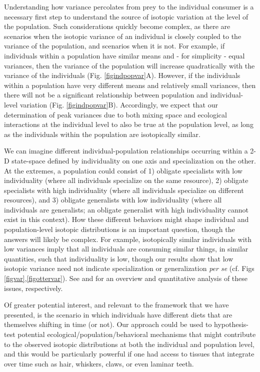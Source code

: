 \documentclass{frontiersSCNS}
\begin{document}
Understanding how variance percolates from prey to the individual consumer is a necessary first step to understand the source of isotopic variation at the level of the population.
Such considerations quickly become complex, as there are scenarios when the isotopic variance of an individual is closely coupled to the variance of the population, and scenarios when it is not.
For example, if individuals within a population have similar means and - for simplicity - equal variances, then the variance of the population will increase quadratically with the variance of the individuals (Fig. \ref{figindpopvar}A).
However, if the individuals within a population have very different means and relatively small variances, then there will not be a significant relationship between population and individual-level variation (Fig. \ref{figindpopvar}B).
Accordingly, we expect that our determination of peak variances due to both mixing space and ecological interactions at the individual level to also be true at the population level, as long as the individuals within the population are isotopically similar.

We can imagine different individual-population relationships occurring within a 2-D state-space defined by individuality on one axis and specialization on the other.
At the extremes, a population could consist of 
1) obligate specialists with low individuality (where all individuals specialize on the same resource),
2) obligate specialists with high individuality (where all individuals specialize on different resources), and
3) obligate generalists with low individuality (where all individuals are generalists; an obligate generalist with high individuality cannot exist in this context). %
How these different behaviors might shape individual and population-level isotopic distributions is an important question, though the answers will likely be complex.
For example, isotopically similar individuals with low variances imply that all individuals are consuming similar things, in similar quantities, such that individuality is low, though our results show that low isotopic variance need not indicate specialization or generalization \emph{per se} (cf. Figs \ref{figvar},\ref{figottervar}).
See \citet{Bearhop:2004im} and \citet{Fink:2012eg} for an overview and quantitative analysis of these issues, respectively.

Of greater potential interest, and relevant to the framework that we have presented, is the scenario in which individuals have different diets that are themselves shifting in time (or not).
Our approach could be used to hypothesis-test potential ecological/population/behavioral mechanisms that might contribute to the observed isotopic distributions at both the individual and population level, and this would be particularly powerful if one had access to tissues that integrate over time such as hair, whiskers, claws, or even laminar teeth.
\end{document}
